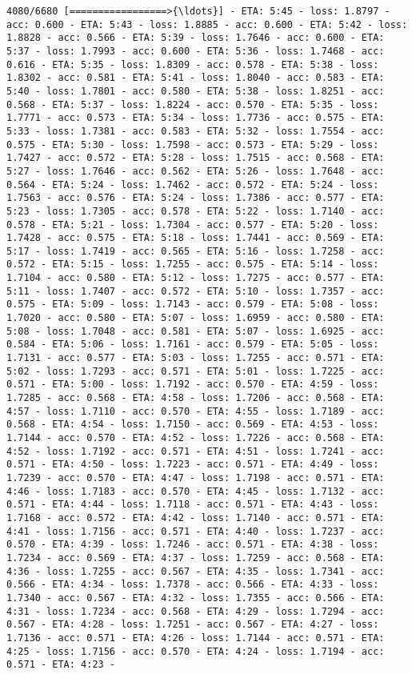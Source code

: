 \documentclass[11pt]{article}
\begin{document}
\begin{Verbatim}[commandchars=\\\{\}]
4080/6680 [=================>{\ldots}] - ETA: 5:45 - loss: 1.8797 - acc: 0.600 - ETA: 5:43 - loss: 1.8885 - acc: 0.600 - ETA: 5:42 - loss: 1.8828 - acc: 0.566 - ETA: 5:39 - loss: 1.7646 - acc: 0.600 - ETA: 5:37 - loss: 1.7993 - acc: 0.600 - ETA: 5:36 - loss: 1.7468 - acc: 0.616 - ETA: 5:35 - loss: 1.8309 - acc: 0.578 - ETA: 5:38 - loss: 1.8302 - acc: 0.581 - ETA: 5:41 - loss: 1.8040 - acc: 0.583 - ETA: 5:40 - loss: 1.7801 - acc: 0.580 - ETA: 5:38 - loss: 1.8251 - acc: 0.568 - ETA: 5:37 - loss: 1.8224 - acc: 0.570 - ETA: 5:35 - loss: 1.7771 - acc: 0.573 - ETA: 5:34 - loss: 1.7736 - acc: 0.575 - ETA: 5:33 - loss: 1.7381 - acc: 0.583 - ETA: 5:32 - loss: 1.7554 - acc: 0.575 - ETA: 5:30 - loss: 1.7598 - acc: 0.573 - ETA: 5:29 - loss: 1.7427 - acc: 0.572 - ETA: 5:28 - loss: 1.7515 - acc: 0.568 - ETA: 5:27 - loss: 1.7646 - acc: 0.562 - ETA: 5:26 - loss: 1.7648 - acc: 0.564 - ETA: 5:24 - loss: 1.7462 - acc: 0.572 - ETA: 5:24 - loss: 1.7563 - acc: 0.576 - ETA: 5:24 - loss: 1.7386 - acc: 0.577 - ETA: 5:23 - loss: 1.7305 - acc: 0.578 - ETA: 5:22 - loss: 1.7140 - acc: 0.578 - ETA: 5:21 - loss: 1.7304 - acc: 0.577 - ETA: 5:20 - loss: 1.7428 - acc: 0.575 - ETA: 5:18 - loss: 1.7441 - acc: 0.569 - ETA: 5:17 - loss: 1.7419 - acc: 0.565 - ETA: 5:16 - loss: 1.7258 - acc: 0.572 - ETA: 5:15 - loss: 1.7255 - acc: 0.575 - ETA: 5:14 - loss: 1.7104 - acc: 0.580 - ETA: 5:12 - loss: 1.7275 - acc: 0.577 - ETA: 5:11 - loss: 1.7407 - acc: 0.572 - ETA: 5:10 - loss: 1.7357 - acc: 0.575 - ETA: 5:09 - loss: 1.7143 - acc: 0.579 - ETA: 5:08 - loss: 1.7020 - acc: 0.580 - ETA: 5:07 - loss: 1.6959 - acc: 0.580 - ETA: 5:08 - loss: 1.7048 - acc: 0.581 - ETA: 5:07 - loss: 1.6925 - acc: 0.584 - ETA: 5:06 - loss: 1.7161 - acc: 0.579 - ETA: 5:05 - loss: 1.7131 - acc: 0.577 - ETA: 5:03 - loss: 1.7255 - acc: 0.571 - ETA: 5:02 - loss: 1.7293 - acc: 0.571 - ETA: 5:01 - loss: 1.7225 - acc: 0.571 - ETA: 5:00 - loss: 1.7192 - acc: 0.570 - ETA: 4:59 - loss: 1.7285 - acc: 0.568 - ETA: 4:58 - loss: 1.7206 - acc: 0.568 - ETA: 4:57 - loss: 1.7110 - acc: 0.570 - ETA: 4:55 - loss: 1.7189 - acc: 0.568 - ETA: 4:54 - loss: 1.7150 - acc: 0.569 - ETA: 4:53 - loss: 1.7144 - acc: 0.570 - ETA: 4:52 - loss: 1.7226 - acc: 0.568 - ETA: 4:52 - loss: 1.7192 - acc: 0.571 - ETA: 4:51 - loss: 1.7241 - acc: 0.571 - ETA: 4:50 - loss: 1.7223 - acc: 0.571 - ETA: 4:49 - loss: 1.7239 - acc: 0.570 - ETA: 4:47 - loss: 1.7198 - acc: 0.571 - ETA: 4:46 - loss: 1.7183 - acc: 0.570 - ETA: 4:45 - loss: 1.7132 - acc: 0.571 - ETA: 4:44 - loss: 1.7118 - acc: 0.571 - ETA: 4:43 - loss: 1.7168 - acc: 0.572 - ETA: 4:42 - loss: 1.7140 - acc: 0.571 - ETA: 4:41 - loss: 1.7156 - acc: 0.571 - ETA: 4:40 - loss: 1.7237 - acc: 0.570 - ETA: 4:39 - loss: 1.7246 - acc: 0.571 - ETA: 4:38 - loss: 1.7234 - acc: 0.569 - ETA: 4:37 - loss: 1.7259 - acc: 0.568 - ETA: 4:36 - loss: 1.7255 - acc: 0.567 - ETA: 4:35 - loss: 1.7341 - acc: 0.566 - ETA: 4:34 - loss: 1.7378 - acc: 0.566 - ETA: 4:33 - loss: 1.7340 - acc: 0.567 - ETA: 4:32 - loss: 1.7355 - acc: 0.566 - ETA: 4:31 - loss: 1.7234 - acc: 0.568 - ETA: 4:29 - loss: 1.7294 - acc: 0.567 - ETA: 4:28 - loss: 1.7251 - acc: 0.567 - ETA: 4:27 - loss: 1.7136 - acc: 0.571 - ETA: 4:26 - loss: 1.7144 - acc: 0.571 - ETA: 4:25 - loss: 1.7156 - acc: 0.570 - ETA: 4:24 - loss: 1.7194 - acc: 0.571 - ETA: 4:23 - 
\end{Verbatim}
\end{document}
